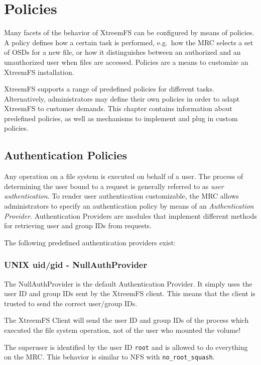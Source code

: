 \documentclass[a4paper,10pt]{book}
\begin{document}
\chapter{Policies} \label{chap:policies}
Many facets of the behavior of XtreemFS can be configured by means of policies. A policy defines how a certain task is performed, e.g.\ how the MRC selects a set of OSDs for a new file, or how it distinguishes between an authorized and an unauthorized user when files are accessed. Policies are a means to customize an XtreemFS installation.

XtreemFS supports a range of predefined policies for different tasks. Alternatively, administrators may define their own policies in order to adapt XtreemFS to customer demands. This chapter contains information about predefined policies, as well as mechanisms to implement and plug in custom policies.

\section{Authentication Policies} \label{sec:authentication_policies}
Any operation on a file system is executed on behalf of a user. The process of determining the user bound to a request is generally referred to as \emph{user authentication}. To render user authentication customizable, the MRC allows administrators to specify an authentication policy by means of an \emph{Authentication Provider}. Authentication Providers are modules that implement different methods for retrieving user and group IDs from requests.

The following predefined authentication providers exist:

\subsection{UNIX uid/gid - NullAuthProvider}

The NullAuthProvider is the default Authentication Provider. It simply uses the user ID and group IDs sent by the XtreemFS client. This means that the client is trusted to send the correct user/group IDs.

The XtreemFS Client will send the user ID and group IDs of the process which executed the file system operation, not of the user who mounted the volume!

The superuser is identified by the user ID \texttt{root} and is allowed to do everything on the MRC. This behavior is similar to NFS with \texttt{no\_root\_squash}.
\end{document}
